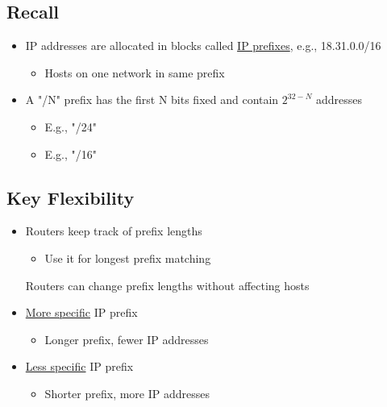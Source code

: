 \documentclass[12pt]{ctexart}   %
\begin{document}
	\subsection{Recall}
	\begin{itemize}
		\item IP addresses are allocated in blocks called \underline{IP prefixes}, e.g., 18.31.0.0/16
		\begin{itemize}
			\item Hosts on one network in same prefix
		\end{itemize}
		
		\item A "/N" prefix has the first N bits fixed and contain $2^{32-N}$ addresses
		\begin{itemize}
			\item E.g., "/24"
			\item E.g., "/16"
		\end{itemize}
	\end{itemize}
	
	\subsection{Key Flexibility}
	\begin{itemize}
		\item Routers keep track of prefix lengths
		\begin{itemize}
			\item Use it for longest prefix matching
		\end{itemize}
		\begin{shaded}
		Routers can change prefix lengths without affecting hosts
		\end{shaded} 
		
		\item \underline{More specific} IP prefix
		\begin{itemize}
			\item Longer prefix, fewer IP addresses
		\end{itemize}			
		
		\item \underline{Less specific} IP prefix
		\begin{itemize}
			\item Shorter prefix, more IP addresses
		\end{itemize}			
	\end{itemize}
	
\end{document}
